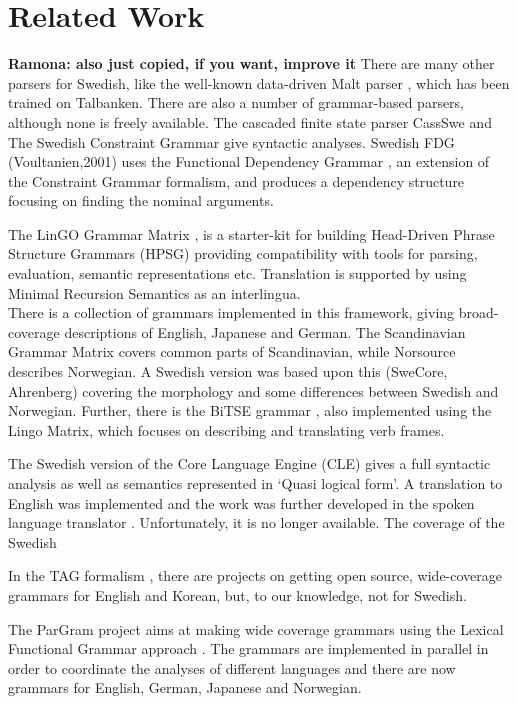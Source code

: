 \documentclass[runningheads,a4paper]{llncs}
\begin{document}
 
\section{Related Work}
\textbf{Ramona: also just copied, if you want, improve it}
%
There are many other parsers for Swedish,
like the well-known data-driven Malt parser \cite{malt},
which has been trained on Talbanken. 
There are also a number of grammar-based parsers, although none is freely available.
The cascaded finite state parser CassSwe \cite{casswe} and
The Swedish Constraint Grammar \cite{birn}
give syntactic analyses. 
Swedish FDG (Voultanien,2001) uses the Functional Dependency Grammar
\cite{fdg},
an extension of the Constraint Grammar
formalism, and produces a dependency structure focusing on finding the nominal
arguments.

The LinGO Grammar Matrix \cite{matrix}, is a starter-kit for building Head-Driven Phrase
Structure Grammars \cite{hpsg} (HPSG) providing compatibility with tools for
parsing, evaluation, semantic representations etc.
Translation is supported by using Minimal Recursion
Semantics \cite{mrs} as an interlingua. \\
There is a collection of grammars implemented in this framework, giving broad-coverage
descriptions of
English, Japanese and German.
The Scandinavian Grammar Matrix \cite{scandmatrix} covers common parts of
Scandinavian, while Norsource \cite{norsource} describes Norwegian. A Swedish version
was based upon this (SweCore, Ahrenberg) covering the morphology and some
differences between Swedish and Norwegian. Further, there is the BiTSE 
grammar \cite{stymne}, also implemented using the Lingo Matrix,
which focuses on describing and translating verb frames.

The Swedish version of the Core Language Engine (CLE) \cite{gamback}
gives a full syntactic analysis as well as semantics represented in `Quasi logical form'. A
translation to English  was implemented and the work was further developed in the spoken
language translator \cite{spoken}. Unfortunately, it is no longer available. The coverage of the Swedish

In the TAG formalism \cite{tag}, there are projects on getting open source, wide-coverage grammars
for English and Korean, but, to our knowledge, not for Swedish.  

The ParGram \cite{pargram} project aims at making wide coverage grammars using
the Lexical Functional Grammar approach \cite{lfg}.
The grammars are implemented in parallel in order to coordinate the analyses of
different languages and there are now grammars for English, German, Japanese and Norwegian. 
\end{document}
